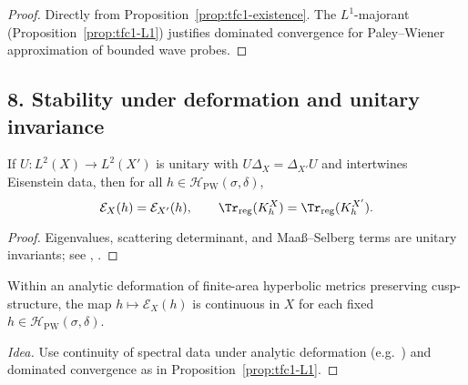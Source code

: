 \begin{proof}\relax\hspace{0pt}
Directly from Proposition~\ref{prop:tfc1-existence}. The $L^1$-majorant (Proposition~\ref{prop:tfc1-L1}) justifies dominated convergence for Paley--Wiener approximation of bounded wave probes.\relax\hspace{0pt}
\end{proof}

\subsection*{8. Stability under deformation and unitary invariance}\relax\hspace{0pt}
\label{subsec:tfc1-stability} %

\begin{proposition}\relax\hspace{0pt}
\label{prop:tfc1-invariance} %
If $U:L^2(X)\to L^2(X')$ is unitary with $U\Delta_X=\Delta_{X'}U$ and intertwines Eisenstein data, then for all $h\in\mathcal{H}_{\mathrm{PW}}(\sigma,\delta)$,
\[
\mathcal{E}_X(h)=\mathcal{E}_{X'}(h),\qquad \Tr_{\mathrm{reg}}(K_h^X)=\Tr_{\mathrm{reg}}(K_h^{X'}).
\]
\end{proposition}

\begin{proof}\relax\hspace{0pt}
Eigenvalues, scattering determinant, and Maaß--Selberg terms are unitary invariants; see \cite[Ch.~3]{LaxPhillips}, \cite[Ch.~3]{HejhalII}.\relax\hspace{0pt}
\end{proof}

\begin{proposition}\relax\hspace{0pt}
\label{prop:tfc1-continuity} %
Within an analytic deformation of finite-area hyperbolic metrics preserving cusp-structure, the map $h\mapsto \mathcal{E}_X(h)$ is continuous in $X$ for each fixed $h\in\mathcal{H}_{\mathrm{PW}}(\sigma,\delta)$.
\end{proposition}

\begin{proof}[Idea]\relax\hspace{0pt}
Use continuity of spectral data under analytic deformation (e.g.\ \cite{Borthwick}) and dominated convergence as in Proposition~\ref{prop:tfc1-L1}.\relax\hspace{0pt}
\end{proof}

